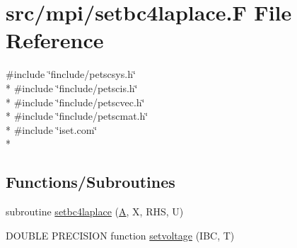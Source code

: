 \hypertarget{mpi_2setbc4laplace_8_f}{\section{src/mpi/setbc4laplace.F File Reference}
\label{mpi_2setbc4laplace_8_f}
}
{\ttfamily \#include \char`\"{}finclude/petscsys.\-h\char`\"{}}\\*
{\ttfamily \#include \char`\"{}finclude/petscis.\-h\char`\"{}}\\*
{\ttfamily \#include \char`\"{}finclude/petscvec.\-h\char`\"{}}\\*
{\ttfamily \#include \char`\"{}finclude/petscmat.\-h\char`\"{}}\\*
{\ttfamily \#include \char`\"{}iset.\-com\char`\"{}}\\*
\subsection*{Functions/\-Subroutines}
\begin{DoxyCompactItemize}
\item 
subroutine \hyperlink{mpi_2setbc4laplace_8_f_acc7b5be1aea767a3abd221d63ceb5a1e}{setbc4laplace} (\hyperlink{ibc2_8com_ad2108d58343608772fff791c23da58f5}{A}, X, R\-H\-S, U)
\item 
D\-O\-U\-B\-L\-E P\-R\-E\-C\-I\-S\-I\-O\-N function \hyperlink{mpi_2setbc4laplace_8_f_a8173a72444957b131275830439be56b1}{setvoltage} (I\-B\-C, T)
\end{DoxyCompactItemize}


